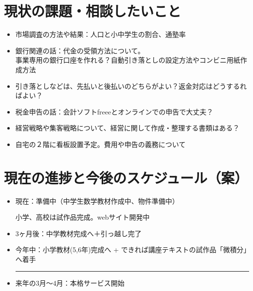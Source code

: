 ﻿\documentclass[12pt]{article}
\begin{document}
\section{現状の課題・相談したいこと}
\begin{itemize}[leftmargin=1.5em]
  \item 市場調査の方法や結果：人口と小中学生の割合、通塾率
  \item 銀行関連の話：代金の受領方法について。\\
  事業専用の銀行口座を作れる？自動引き落としの設定方法やコンビニ用紙作成方法
  \item 引き落としなどは、先払いと後払いのどちらがよい？返金対応はどうするればよい？
  \item 税金申告の話：会計ソフトfreeeとオンラインでの申告で大丈夫？
  \item 経営戦略や集客戦略について、経営に関して作成・整理する書類はある？
  \item 自宅の２階に看板設置予定。費用や申告の義務について
\end{itemize}


\section{現在の進捗と今後のスケジュール（案）}
\begin{itemize}[leftmargin=1.5em, parsep=4pt]
  \item 現在：準備中（中学生数学教材作成中、物件準備中）
    
  小学、高校は試作品完成。webサイト開発中
  
  \item 3ヶ月後：中学教材完成へ＋引っ越し完了
  \item 今年中：小学教材(5,6年)完成へ + できれば講座テキストの試作品「微積分」へ着手
  
  \vspace{4mm} \hrule height 1.5pt \vspace{3mm}
  
  \item 来年の3月～4月：本格サービス開始
\end{itemize}

\end{document}
